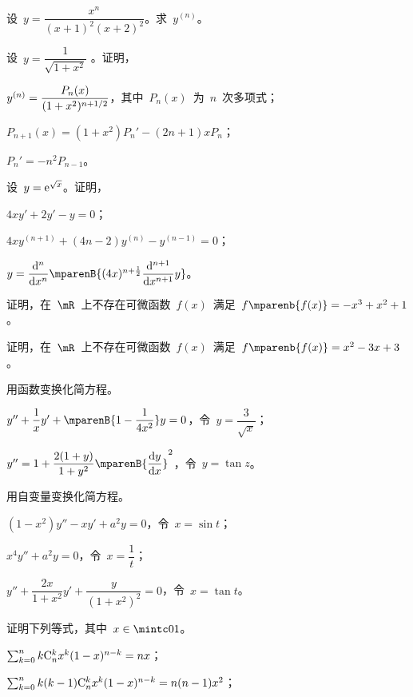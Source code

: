 \begin{exercise*}
\item 设~$y=\dfrac{x^n}{(x+1)^2(x+2)^2}$。求~$y^{(n)}$。
\item 设~$y=\dfrac1{\sqrt{1+x^2}}$ 。证明，
\begin{exlistcols}
  \item $y^{(n)}=\dfrac{P_n(x)}{(1+x^2)^{n+1\mathord{/}2}}$，其中~$P_n(x)$~为~$n$~次多项式；
  \item $P_{n+1}(x)=(1+x^2)P_n'-(2n+1)xP_n$；
  \item $P_n'=-n^2P_{n-1}$。
\end{exlistcols}
\item 设~$y=\mathrm e^{\sqrt x}$。证明，
\begin{exlistcols}
  \item $4xy'+2y'-y=0$；
  \item $4xy^{(n+1)}+(4n-2)y^{(n)}-y^{(n-1)}=0$；
  \item $y=\dfrac{\dif^n}{\dif x^n}\mparenB{(4x)^{n+\frac12}\dfrac{\dif^{n+1}}{\dif x^{n+1}}y}$。
\end{exlistcols}
\item 证明，在~$\mR$~上不存在可微函数~$f(x)$~满足~$f\mparenb{f(x)}=-x^3+x^2+1$。
\item 证明，在~$\mR$~上不存在可微函数~$f(x)$~满足~$f\mparenb{f(x)}=x^2-3x+3$。
\item 用函数变换化简方程。
\begin{exlistcols}
  \item $y''+\dfrac1xy'+\mparenB{1-\dfrac1{4x^2}}y=0$，令~$y=\dfrac3{\sqrt x}$；
  \item $y''=1+\dfrac{2(1+y)}{1+y^2}\mparenB{\dfrac{\dif y}{\dif x}}^2$，令~$y=\tan z$。
\end{exlistcols}
\item 用自变量变换化简方程。
\begin{exlistcols}
  \item $(1-x^2)y''-xy'+a^2y=0$，令~$x=\sin t$；
  \item $x^4y''+a^2y=0$，令~$x=\dfrac1t$；
  \item $y''+\dfrac{2x}{1+x^2}y'+\dfrac y{(1+x^2)^2}=0$，令~$x=\tan t$。
\end{exlistcols}
\item 证明下列等式，其中~$x\in\mintc 01$。
\begin{exlistcols}
  \item $\sum_{k=0}^nk\mathrm C_{n}^{k}x^k(1-x)^{n-k}=nx$；
  \item $\sum_{k=0}^nk(k-1)\mathrm C_{n}^{k}x^k(1-x)^{n-k}=n(n-1)x^2$；

\end{exlistcols}
\end{exercise*}
